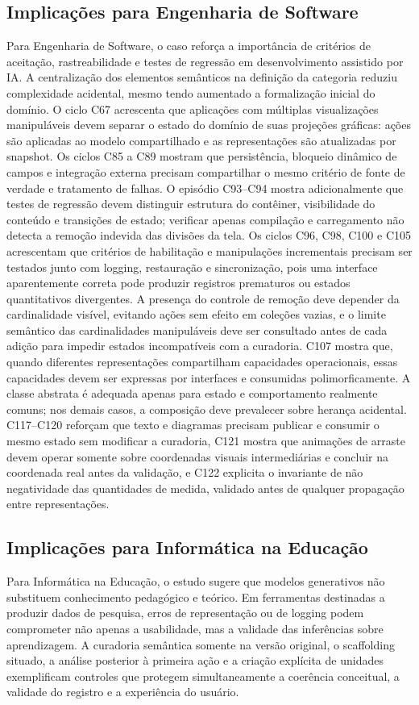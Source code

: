 \documentclass[preprint,12pt,authoryear]{elsarticle}
\begin{document}
\subsection{Implicações para Engenharia de Software}
Para Engenharia de Software, o caso reforça a importância de critérios de aceitação, rastreabilidade e testes de regressão em desenvolvimento assistido por IA. A centralização dos elementos semânticos na definição da categoria reduziu complexidade acidental, mesmo tendo aumentado a formalização inicial do domínio. O ciclo C67 acrescenta que aplicações com múltiplas visualizações manipuláveis devem separar o estado do domínio de suas projeções gráficas: ações são aplicadas ao modelo compartilhado e as representações são atualizadas por snapshot. Os ciclos C85 a C89 mostram que persistência, bloqueio dinâmico de campos e integração externa precisam compartilhar o mesmo critério de fonte de verdade e tratamento de falhas. O episódio C93--C94 mostra adicionalmente que testes de regressão devem distinguir estrutura do contêiner, visibilidade do conteúdo e transições de estado; verificar apenas compilação e carregamento não detecta a remoção indevida das divisões da tela. Os ciclos C96, C98, C100 e C105 acrescentam que critérios de habilitação e manipulações incrementais precisam ser testados junto com logging, restauração e sincronização, pois uma interface aparentemente correta pode produzir registros prematuros ou estados quantitativos divergentes. A presença do controle de remoção deve depender da cardinalidade visível, evitando ações sem efeito em coleções vazias, e o limite semântico das cardinalidades manipuláveis deve ser consultado antes de cada adição para impedir estados incompatíveis com a curadoria. C107 mostra que, quando diferentes representações compartilham capacidades operacionais, essas capacidades devem ser expressas por interfaces e consumidas polimorficamente. A classe abstrata é adequada apenas para estado e comportamento realmente comuns; nos demais casos, a composição deve prevalecer sobre herança acidental. C117--C120 reforçam que texto e diagramas precisam publicar e consumir o mesmo estado sem modificar a curadoria, C121 mostra que animações de arraste devem operar somente sobre coordenadas visuais intermediárias e concluir na coordenada real antes da validação, e C122 explicita o invariante de não negatividade das quantidades de medida, validado antes de qualquer propagação entre representações.

\subsection{Implicações para Informática na Educação}
Para Informática na Educação, o estudo sugere que modelos generativos não substituem conhecimento pedagógico e teórico. Em ferramentas destinadas a produzir dados de pesquisa, erros de representação ou de logging podem comprometer não apenas a usabilidade, mas a validade das inferências sobre aprendizagem. A curadoria semântica somente na versão original, o scaffolding situado, a análise posterior à primeira ação e a criação explícita de unidades exemplificam controles que protegem simultaneamente a coerência conceitual, a validade do registro e a experiência do usuário.
\end{document}
